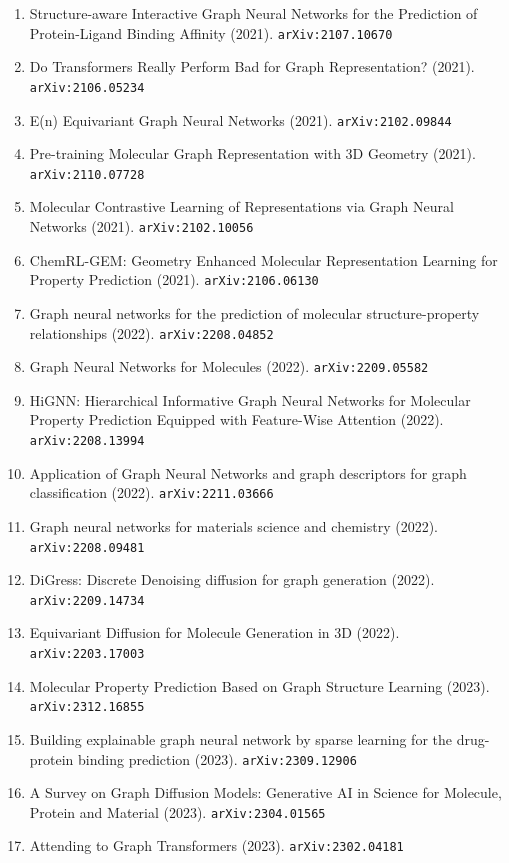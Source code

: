 \documentclass[11pt]{article}
\begin{document}
\begin{enumerate}
  deep generative models (2021). \texttt{arXiv:2104.08474}
  \item Structure-aware Interactive Graph Neural Networks for the Prediction of
  Protein-Ligand Binding Affinity (2021). \texttt{arXiv:2107.10670}
  \item Do Transformers Really Perform Bad for Graph Representation? (2021). \texttt{arXiv:2106.05234}
  \item E(n) Equivariant Graph Neural Networks (2021). \texttt{arXiv:2102.09844}
  \item Pre-training Molecular Graph Representation with 3D Geometry (2021). \texttt{arXiv:2110.07728}
  \item Molecular Contrastive Learning of Representations via Graph Neural
  Networks (2021). \texttt{arXiv:2102.10056}
  \item ChemRL-GEM: Geometry Enhanced Molecular Representation Learning for
  Property Prediction (2021). \texttt{arXiv:2106.06130}
  \item Graph neural networks for the prediction of molecular structure-property
  relationships (2022). \texttt{arXiv:2208.04852}
  \item Graph Neural Networks for Molecules (2022). \texttt{arXiv:2209.05582}
  \item HiGNN: Hierarchical Informative Graph Neural Networks for Molecular
  Property Prediction Equipped with Feature-Wise Attention (2022). \texttt{arXiv:2208.13994}
  \item Application of Graph Neural Networks and graph descriptors for graph
  classification (2022). \texttt{arXiv:2211.03666}
  \item Graph neural networks for materials science and chemistry (2022). \texttt{arXiv:2208.09481}
  \item DiGress: Discrete Denoising diffusion for graph generation (2022). \texttt{arXiv:2209.14734}
  \item Equivariant Diffusion for Molecule Generation in 3D (2022). \texttt{arXiv:2203.17003}
  \item Molecular Property Prediction Based on Graph Structure Learning (2023). \texttt{arXiv:2312.16855}
  \item Building explainable graph neural network by sparse learning for the
  drug-protein binding prediction (2023). \texttt{arXiv:2309.12906}
  \item A Survey on Graph Diffusion Models: Generative AI in Science for
  Molecule, Protein and Material (2023). \texttt{arXiv:2304.01565}
  \item Attending to Graph Transformers (2023). \texttt{arXiv:2302.04181}

\end{enumerate}
\end{document}
